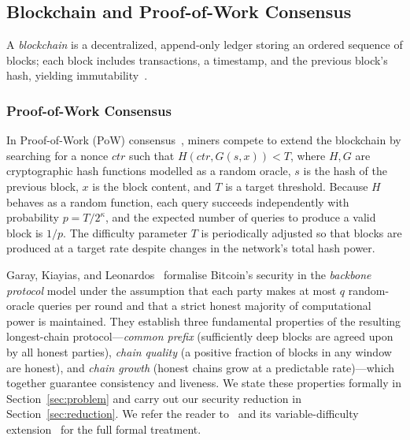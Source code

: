 \subsection{Blockchain and Proof-of-Work Consensus}

A \emph{blockchain} is a decentralized, append-only ledger storing an ordered sequence of blocks; each block includes transactions, a timestamp, and the previous block's hash, yielding immutability~\cite{nakamoto2008bitcoin,bonneau2015sok}.

\subsubsection{Proof-of-Work Consensus}

In Proof-of-Work (PoW) consensus~\cite{nakamoto2008bitcoin}, miners compete to extend the blockchain by searching for a nonce $\mathit{ctr}$ such that $H(\mathit{ctr}, G(s, x)) < T$, where $H,G$ are cryptographic hash functions modelled as a random oracle, $s$ is the hash of the previous block, $x$ is the block content, and $T$ is a target threshold.  Because $H$ behaves as a random function, each query succeeds independently with probability $p = T/2^{\kappa}$, and the expected number of queries to produce a valid block is $1/p$.  The difficulty parameter $T$ is periodically adjusted so that blocks are produced at a target rate despite changes in the network's total hash power.

Garay, Kiayias, and Leonardos~\cite{GKL20} formalise Bitcoin's security in the \emph{backbone protocol} model under the assumption that each party makes at most $q$ random-oracle queries per round and that a strict honest majority of computational power is maintained. They establish three fundamental properties of the resulting longest-chain protocol---\emph{common prefix} (sufficiently deep blocks are agreed upon by all honest parties), \emph{chain quality} (a positive fraction of blocks in any window are honest), and \emph{chain growth} (honest chains grow at a predictable rate)---which together guarantee consistency and liveness. We state these properties formally in Section~\ref{sec:problem} and carry out our security reduction in Section~\ref{sec:reduction}. We refer the reader to~\cite{GKL20} and its variable-difficulty extension~\cite{GKL17} for the full formal treatment.
